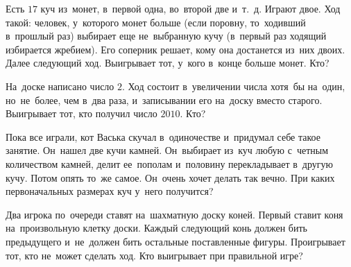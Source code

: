 \begin{problems}
\item
Есть $17$ куч из~монет, в~первой одна, во~второй две и~т.~д.
Играют двое.
Ход такой: человек, у~которого монет больше (если поровну, то~ходивший
в~прошлый раз) выбирает еще не~выбранную кучу (в~первый раз ходящий избирается
жребием).
Его соперник решает, кому она достанется из~них двоих.
Далее следующий ход.
Выигрывает тот, у~кого в~конце больше монет.
Кто?

\item
На~доске написано число $2$.
Ход состоит в~увеличении числа хотя~бы на~один, но~не~более, чем в~два раза,
и~записывании его на~доску вместо старого.
Выигрывает тот, кто получил число $2010$.
Кто?

\item
Пока все играли, кот Васька скучал в~одиночестве и~придумал себе такое занятие.
Он~нашел две кучи камней.
Он~выбирает из~куч любую с~четным количеством камней, делит ее~пополам
и~половину перекладывает в~другую кучу.
Потом опять то~же самое.
Он~очень хочет делать так вечно.
При каких первоначальных размерах куч у~него получится?

\item
Два игрока по~очереди ставят на~шахматную доску коней.
Первый ставит коня на~произвольную клетку доски.
Каждый следующий конь должен бить предыдущего и~не~должен бить остальные
поставленные фигуры.
Проигрывает тот, кто не~может сделать ход.
Кто выигрывает при правильной игре?

\end{problems}

